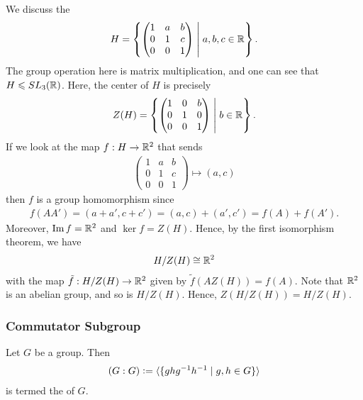 \begin{example}
    We discuss the 
    \begin{align}
        H = \left\{ \begin{pmatrix}
              1 & a & b \\
              0 & 1 & c \\
              0 & 0 & 1
           \end{pmatrix} \;\middle|\; a,b,c \in \mathbb{R} \right\}.
    \end{align}
    The group operation here is matrix multiplication, and one can see that $H \leqslant SL_{3}(\mathbb{R})$. Here, the center of $H$ is precisely 
    \begin{align}
        Z(H) = \left\{ \begin{pmatrix}
              1 & 0 & b \\
              0 & 1 & 0 \\
              0 & 0 & 1
           \end{pmatrix} \;\middle|\; b \in \mathbb{R} \right\}.
    \end{align}
    If we look at the map $f:H \to \mathbb{R}^{2}$ that sends
    \begin{align}
        \begin{pmatrix}
              1 & a & b \\
              0 & 1 & c \\
              0 & 0 & 1
           \end{pmatrix} \mapsto (a,c)
    \end{align}
    then $f$ is a group homomorphism since
    \begin{align}
        f(AA') = (a+a',c+c') = (a,c) + (a',c') = f(A) + f(A').
    \end{align}
    Moreover, $\operatorname{Im} f = \mathbb{R}^{2}$ and $\ker f = Z(H)$. Hence, by the first isomorphism theorem, we have
    \begin{align}
        H/Z(H) \cong \mathbb{R}^{2}
    \end{align}
    with the map $\tilde{f}:H/Z(H) \to \mathbb{R}^{2}$ given by $\tilde{f}(A Z(H)) = f(A)$. Note that $\mathbb{R}^{2}$ is an abelian group, and so is $H/Z(H)$. Hence, $Z(H/Z(H)) = H/Z(H)$.
\end{example}


\subsubsection{Commutator Subgroup}

\begin{definition}
    Let $G$ be a group. Then
    \begin{align}
        (G:G) \vcentcolon= \langle\{ghg^{-1}h^{-1} \mid g,h \in G\}\rangle
    \end{align}
    is termed the  of $G$.
\end{definition}

